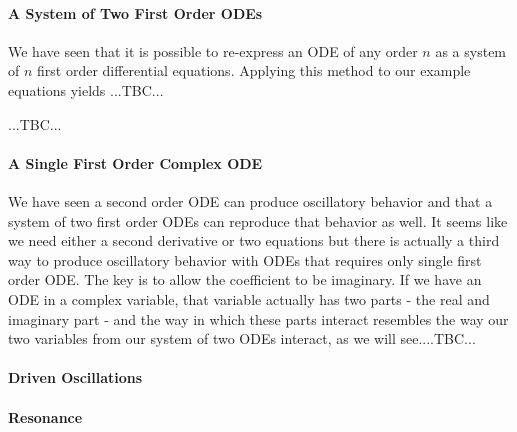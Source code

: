 \paragraph{A System of Two First Order ODEs}
We have seen that it is possible to re-express an ODE of any order $n$ as a system of $n$ first order differential equations. Applying this method to our example equations yields ...TBC...


...TBC...


\paragraph{A Single First Order Complex ODE}
We have seen a second order ODE can produce oscillatory behavior and that a system of two first order ODEs can reproduce that behavior as well. It seems like we need either a second derivative or two equations but there is actually a third way to produce oscillatory behavior with ODEs that requires only single first order ODE. The key is to allow the coefficient to be imaginary. If we have an ODE in a complex variable, that variable actually has two parts - the real and imaginary part - and the way in which these parts interact resembles the way our two variables from our system of two ODEs interact, as we will see....TBC...





\paragraph{Driven Oscillations}

\paragraph{Resonance}

